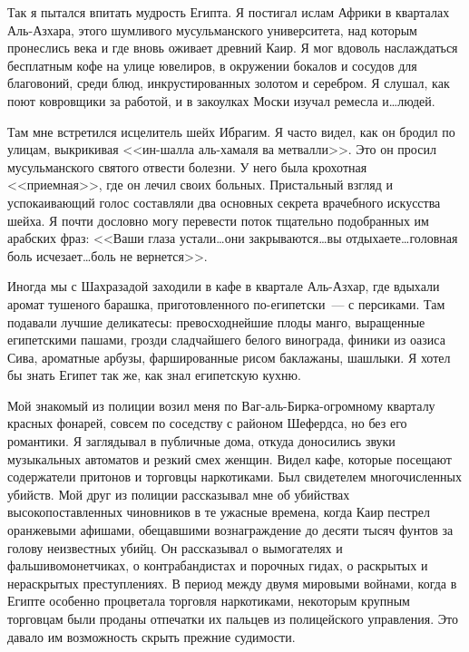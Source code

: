 \documentclass[12pt,a4paper,twoside,openany,svgnames]{memoir}
\begin{document}
Так я пытался впитать мудрость Египта. Я постигал ислам Африки в кварталах Аль-Азхара, этого шумливого мусульманского университета, над которым пронеслись века и где вновь оживает древний Каир. Я мог вдоволь наслаждаться бесплатным кофе на улице ювелиров, в окружении бокалов и сосудов для благовоний, среди блюд, инкрустированных золотом и серебром. Я слушал, как поют ковровщики за работой, и в закоулках Моски изучал ремесла и\ldots людей.

Там мне встретился исцелитель шейх Ибрагим. Я часто видел, как он бродил по улицам, выкрикивая <<ин-шалла аль-хамаля ва метвалли>>. Это он просил мусульманского святого отвести болезни. У него была крохотная <<приемная>>, где он лечил своих больных. Пристальный взгляд и успокаивающий голос составляли два основных секрета врачебного искусства шейха. Я почти дословно могу перевести поток тщательно подобранных им арабских фраз: <<Ваши глаза устали\ldots они закрываются\ldots вы отдыхаете\ldots головная боль исчезает\ldots боль не вернется>>.

Иногда мы с Шахразадой заходили в кафе в квартале Аль-Азхар, где вдыхали аромат тушеного барашка, приготовленного по-египетски~--- с персиками. Там подавали лучшие деликатесы: превосходнейшие плоды манго, выращенные египетскими пашами, грозди сладчайшего белого винограда, финики из оазиса Сива, ароматные арбузы, фаршированные рисом баклажаны, шашлыки. Я хотел бы знать Египет так же, как знал египетскую кухню.

Мой знакомый из полиции возил меня по Ваг-аль-Бирка-огромному кварталу красных фонарей, совсем по соседству с районом Шефердса, но без его романтики. Я заглядывал в публичные дома, откуда доносились звуки музыкальных автоматов и резкий смех женщин. Видел кафе, которые посещают содержатели притонов и торговцы наркотиками. Был свидетелем многочисленных убийств. Мой друг из полиции рассказывал мне об убийствах высокопоставленных чиновников в те ужасные времена, когда Каир пестрел оранжевыми афишами, обещавшими вознаграждение до десяти тысяч фунтов за голову неизвестных убийц. Он рассказывал о вымогателях и фальшивомонетчиках, о контрабандистах и порочных гидах, о раскрытых и нераскрытых преступлениях. В период между двумя мировыми войнами, когда в Египте особенно процветала торговля наркотиками, некоторым крупным торговцам были проданы отпечатки их пальцев из полицейского управления. Это давало им возможность скрыть прежние судимости.
\end{document}
